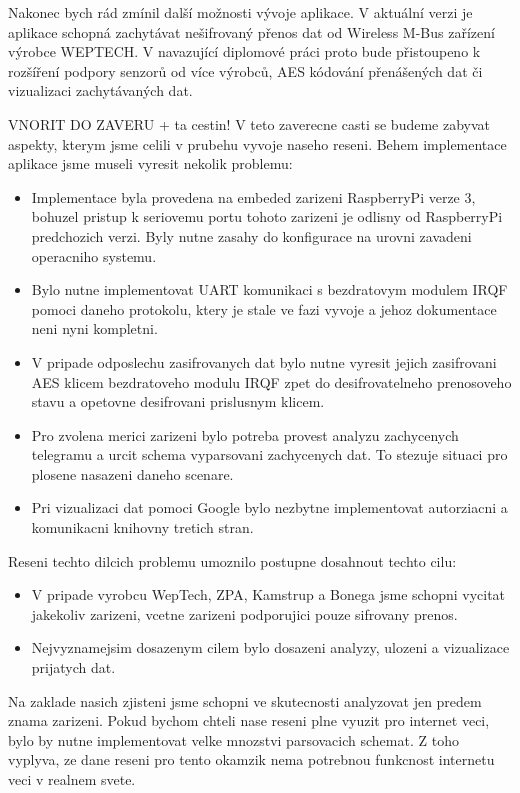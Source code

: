 Nakonec bych rád zmínil další možnosti vývoje aplikace. V aktuální verzi je aplikace schopná zachytávat nešifrovaný přenos dat od Wireless M-Bus zařízení výrobce WEPTECH. V navazující diplomové práci proto bude přistoupeno k rozšíření podpory senzorů od více výrobců, AES kódování přenášených dat či vizualizaci zachytávaných dat.



\colorbox[rgb]{1,0,0}{VNORIT DO ZAVERU + ta cestin!}
V teto zaverecne casti se budeme zabyvat aspekty, kterym jsme celili v prubehu vyvoje naseho reseni. 
Behem implementace aplikace jsme museli vyresit nekolik problemu:
\begin{itemize}
	\item Implementace byla provedena na embeded zarizeni RaspberryPi verze 3, bohuzel pristup k seriovemu portu tohoto zarizeni je odlisny od RaspberryPi predchozich verzi. Byly nutne zasahy do konfigurace na urovni zavadeni operacniho systemu.
	\item Bylo nutne implementovat UART komunikaci s bezdratovym modulem IRQF pomoci daneho protokolu, ktery je stale ve fazi vyvoje a jehoz dokumentace neni nyni kompletni.
	\item V pripade odposlechu zasifrovanych dat bylo nutne vyresit jejich zasifrovani AES klicem bezdratoveho modulu IRQF zpet do desifrovatelneho prenosoveho stavu a opetovne desifrovani prislusnym klicem.
	\item Pro zvolena merici zarizeni bylo potreba provest analyzu zachycenych telegramu a urcit schema vyparsovani zachycenych dat. To stezuje situaci pro plosene nasazeni daneho scenare.
	\item Pri vizualizaci dat pomoci Google bylo nezbytne implementovat autorziacni a komunikacni knihovny tretich stran.
\end{itemize}
Reseni techto dilcich problemu umoznilo postupne dosahnout techto cilu:
\begin{itemize}
	\item V pripade vyrobcu WepTech, ZPA, Kamstrup a Bonega jsme schopni vycitat jakekoliv zarizeni, vcetne zarizeni podporujici pouze sifrovany prenos.	
	\item Nejvyznamejsim dosazenym cilem bylo dosazeni analyzy, ulozeni a vizualizace prijatych dat.
\end{itemize}

Na zaklade nasich zjisteni jsme schopni ve skutecnosti analyzovat jen predem znama zarizeni. Pokud bychom chteli nase reseni plne vyuzit pro internet veci, bylo by nutne implementovat velke mnozstvi parsovacich schemat. Z toho vyplyva, ze dane reseni pro tento okamzik nema potrebnou funkcnost internetu veci v realnem svete.


